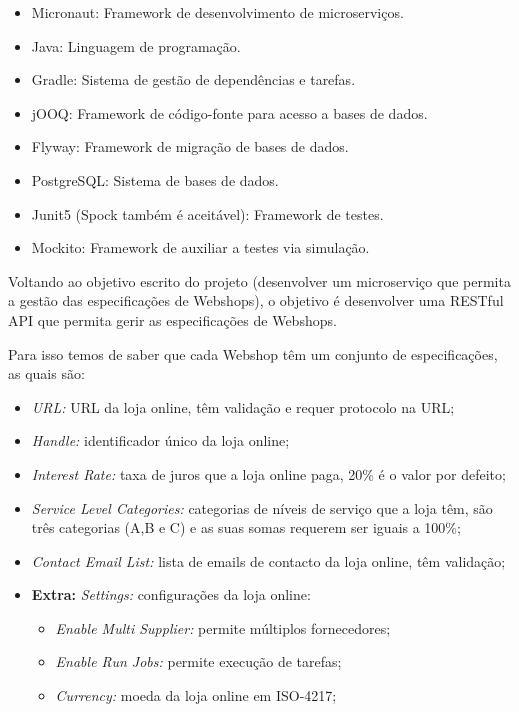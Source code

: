 \begin{itemize}
  \item Micronaut: Framework de desenvolvimento de microserviços.
  \item Java: Linguagem de programação.
  \item Gradle: Sistema de gestão de dependências e tarefas.
  \item jOOQ: Framework de código-fonte para acesso a bases de dados.
  \item Flyway: Framework de migração de bases de dados.
  \item PostgreSQL: Sistema de bases de dados.
  \item Junit5 (Spock também é aceitável): Framework de testes.
  \item Mockito: Framework de auxiliar a testes via simulação.
\end{itemize}

Voltando ao objetivo escrito do projeto (desenvolver um microserviço que permita a gestão das especificações de Webshops), o objetivo é desenvolver uma RESTful API que permita gerir as especificações de Webshops.

Para isso temos de saber que cada Webshop têm um conjunto de especificações, as quais são:

\begin{itemize}
  \item \textit{URL:} URL da loja online, têm validação e requer protocolo na URL;
  \item \textit{Handle:} identificador único da loja online;
  \item \textit{Interest Rate:} taxa de juros que a loja online paga, 20\% é o valor por defeito;
  \item \textit{Service Level Categories:} categorias de níveis de serviço que a loja têm, são três categorias (A,B e C) e as suas somas requerem ser iguais a 100\%;
  \item \textit{Contact Email List:} lista de emails de contacto da loja online, têm validação;
  \item \textbf{Extra:} \textit{Settings:} configurações da loja online:
    \begin{itemize}
      \item \textit{Enable Multi Supplier:} permite múltiplos fornecedores;
      \item \textit{Enable Run Jobs:} permite execução de tarefas;
      \item \textit{Currency:} moeda da loja online em ISO-4217;
    \end{itemize}
\end{itemize}

